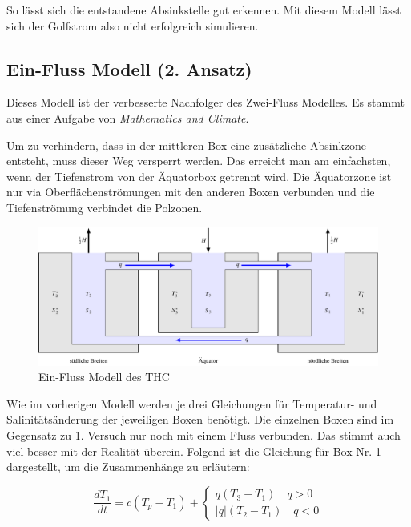 So lässt sich die entstandene Absinkstelle gut erkennen. 
Mit diesem Modell lässt sich der Golfstrom also nicht erfolgreich simulieren. 

\subsection{Ein-Fluss Modell (2. Ansatz)}\label{thermohalin:3b1f_title}

Dieses Modell ist der verbesserte Nachfolger des Zwei-Fluss Modelles.
Es stammt aus einer Aufgabe von {\em Mathematics and Climate}\cite{skript:kaperengler}.

Um zu verhindern, dass in der mittleren Box eine zusätzliche Absinkzone entsteht, muss dieser Weg versperrt werden. Das erreicht man am einfachsten, wenn der Tiefenstrom von der Äquatorbox getrennt wird. Die Äquatorzone ist nur via Oberflächenströmungen mit den anderen Boxen verbunden und die Tiefenströmung verbindet die Polzonen.


\begin{figure}
	\centering
	\includegraphics[width=14cm]{thermohalin/tikz/3b1f.pdf}
	\caption{Ein-Fluss Modell des THC}
	\label{thermohalin:3b1f}
\end{figure}

Wie im vorherigen Modell werden je drei Gleichungen für Temperatur- und Salinitätsänderung der jeweiligen Boxen benötigt.
Die einzelnen Boxen sind im Gegensatz zu 1. Versuch nur noch  mit einem Fluss verbunden. Das stimmt auch viel besser mit der Realität überein. Folgend ist die Gleichung für Box Nr. 1 dargestellt, um die Zusammenhänge zu erläutern:

\begin{equation}
\frac{dT_1}{dt} = c(T_p-T_1)+ \begin{cases} q(T_3-T_1)  \quad q>0 \\ |q|(T_2-T_1)  \quad q<0 \end{cases}
\end{equation}

